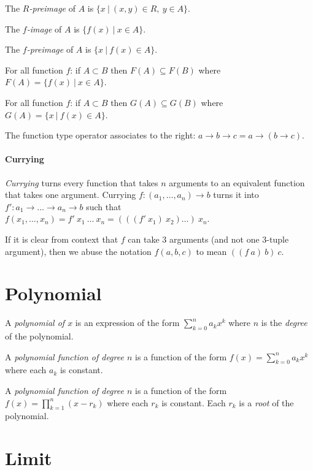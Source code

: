 The
%
\emph{\(R\)-preimage} of \(A\) is \(\{ x ~|~ (x,y) \in R, ~ y \in A \}\).

The
%
\emph{\(f\)-image} of \(A\) is \(\{ f(x) ~|~ x \in A \}\).

The
%
\emph{\(f\)-preimage} of \(A\) is \(\{ x ~|~ f(x) \in A \}\).

For all function \(f\):
if \(A \subset B\) then \(F(A) \subseteq F(B)\)
where \(F(A) = \{ f(x) ~|~ x \in A \}\).

For all function \(f\):
if \(A \subset B\) then \(G(A) \subseteq G(B)\)
where \(G(A) = \{ x ~|~ f(x) \in A \}\).

The function type operator associates to the right: \(a \to b \to c = a \to (b \to c)\).

\paragraph{Currying}
%
%
\emph{Currying} turns every function that takes \(n\) arguments
to an equivalent function that takes one argument.
Currying \(f : (a_1,\ldots,a_n) \to b\) turns it into \(f' : a_1 \to \ldots \to a_n \to b\)
such that \(f(x_1,\ldots,x_n)
= f'~x_1~\ldots~x_n
= (((f'~x_1)~x_2)\ldots)~x_n\).

If it is clear from context that \(f\) can take 3 arguments (and not one 3-tuple argument),
then we abuse the notation \(f(a,b,c)\) to mean \(((f~a)~b)~c\).

\section{Polynomial}

A \emph{polynomial of \(x\)} is an expression of the form \(\sum_{k=0}^n a_k x^k\)
where \(n\) is the \emph{degree} of the polynomial.

A
%
\emph{polynomial function of degree \(n\)} is a function of the form
\(f(x) = \sum_{k=0}^n a_k x^k\) where each \(a_k\) is constant.

A \emph{polynomial function of degree \(n\)} is a function of the form
\(f(x) = \prod_{k=1}^n (x - r_k)\) where each \(r_k\) is constant.
Each \(r_k\) is a \emph{root} of the polynomial.

\section{Limit}

